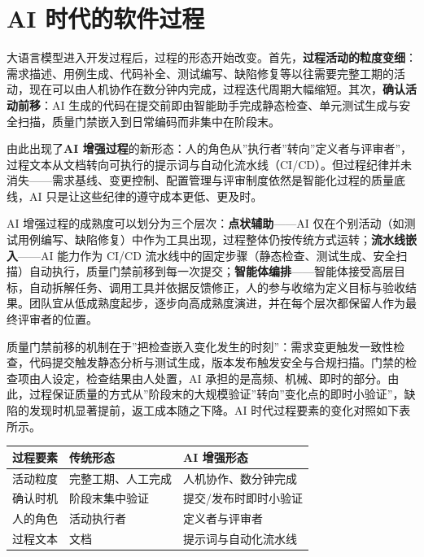\documentclass[
]{ctexbook}
\newcounter{none}
\begin{document}
\section{AI
时代的软件过程}\label{ai-ux65f6ux4ee3ux7684ux8f6fux4ef6ux8fc7ux7a0b}

大语言模型进入开发过程后，过程的形态开始改变。首先，\textbf{过程活动的粒度变细}：需求描述、用例生成、代码补全、测试编写、缺陷修复等以往需要完整工期的活动，现在可以由人机协作在数分钟内完成，过程迭代周期大幅缩短。其次，\textbf{确认活动前移}：AI
生成的代码在提交前即由智能助手完成静态检查、单元测试生成与安全扫描，质量门禁嵌入到日常编码而非集中在阶段末。

由此出现了\textbf{AI
增强过程}的新形态：人的角色从''执行者''转向''定义者与评审者''，过程文本从文档转向可执行的提示词与自动化流水线（CI/CD）。但过程纪律并未消失------需求基线、变更控制、配置管理与评审制度依然是智能化过程的质量底线，AI
只是让这些纪律的遵守成本更低、更及时。

AI 增强过程的成熟度可以划分为三个层次：\textbf{点状辅助}------AI
仅在个别活动（如测试用例编写、缺陷修复）中作为工具出现，过程整体仍按传统方式运转；\textbf{流水线嵌入}------AI
能力作为 CI/CD
流水线中的固定步骤（静态检查、测试生成、安全扫描）自动执行，质量门禁前移到每一次提交；\textbf{智能体编排}------智能体接受高层目标，自动拆解任务、调用工具并依据反馈修正，人的参与收缩为定义目标与验收结果。团队宜从低成熟度起步，逐步向高成熟度演进，并在每个层次都保留人作为最终评审者的位置。

质量门禁前移的机制在于''把检查嵌入变化发生的时刻''：需求变更触发一致性检查，代码提交触发静态分析与测试生成，版本发布触发安全与合规扫描。门禁的检查项由人设定，检查结果由人处置，AI
承担的是高频、机械、即时的部分。由此，过程保证质量的方式从''阶段末的大规模验证''转向''变化点的即时小验证''，缺陷的发现时机显著提前，返工成本随之下降。AI
时代过程要素的变化对照如下表所示。

{\def\LTcaptype{none} %
\begin{longtable}[]{@{}lll@{}}
\toprule\noalign{}
过程要素 & 传统形态 & AI 增强形态 \\
\midrule\noalign{}
\endhead
\bottomrule\noalign{}
\endlastfoot
活动粒度 & 完整工期、人工完成 & 人机协作、数分钟完成 \\
确认时机 & 阶段末集中验证 & 提交/发布时即时小验证 \\
人的角色 & 活动执行者 & 定义者与评审者 \\
过程文本 & 文档 & 提示词与自动化流水线 \\
\end{longtable}
}
\end{document}
